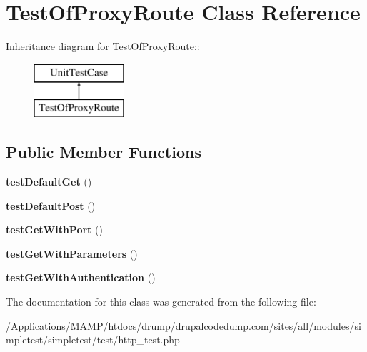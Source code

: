 \hypertarget{class_test_of_proxy_route}{
\section{TestOfProxyRoute Class Reference}
\label{class_test_of_proxy_route}
}
Inheritance diagram for TestOfProxyRoute::\begin{figure}[H]
\begin{center}
\leavevmode
\includegraphics[height=2cm]{class_test_of_proxy_route}
\end{center}
\end{figure}
\subsection*{Public Member Functions}
\begin{DoxyCompactItemize}
\item 
\hypertarget{class_test_of_proxy_route_a4edc57f6679e973e679171a9a72a8a8f}{
{\bfseries testDefaultGet} ()}
\label{class_test_of_proxy_route_a4edc57f6679e973e679171a9a72a8a8f}

\item 
\hypertarget{class_test_of_proxy_route_a04312e670d5cb84da09ea852f9b77f6a}{
{\bfseries testDefaultPost} ()}
\label{class_test_of_proxy_route_a04312e670d5cb84da09ea852f9b77f6a}

\item 
\hypertarget{class_test_of_proxy_route_a4a1edf8fe3dbe8e1f61e1fd40d3bb813}{
{\bfseries testGetWithPort} ()}
\label{class_test_of_proxy_route_a4a1edf8fe3dbe8e1f61e1fd40d3bb813}

\item 
\hypertarget{class_test_of_proxy_route_a7fe425bcda1b26bfc9e44c9a9dd891bf}{
{\bfseries testGetWithParameters} ()}
\label{class_test_of_proxy_route_a7fe425bcda1b26bfc9e44c9a9dd891bf}

\item 
\hypertarget{class_test_of_proxy_route_a368be107731f03d7f959ff59f1399942}{
{\bfseries testGetWithAuthentication} ()}
\label{class_test_of_proxy_route_a368be107731f03d7f959ff59f1399942}

\end{DoxyCompactItemize}


The documentation for this class was generated from the following file:\begin{DoxyCompactItemize}
\item 
/Applications/MAMP/htdocs/drump/drupalcodedump.com/sites/all/modules/simpletest/simpletest/test/http\_\-test.php\end{DoxyCompactItemize}
